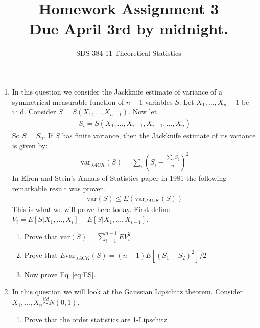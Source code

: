\documentclass[11pt]{article}
\newcommand{\var}{\text{var}}
\begin{document}
\title{{\bf Homework Assignment 3}\\Due April 3rd by midnight.}
\author{SDS 384-11 Theoretical Statistics}

\date{}

\maketitle{}
\begin{enumerate}%
\item 
In this question we consider the Jackknife estimate of variance of a symmetrical measurable function of $n-1$ variables $S$. Let $X_1,\dots,X_n-1$ be i.i.d. Consider $S=S(X_1,\dots,X_{n-1})$. Now let
\begin{align*}
S_i=S(X_1,\dots,X_{i-1},X_{i+1},\dots, X_n)
\end{align*}
So $S=S_n$. If $S$ has finite variance, then the Jackknife estimate of its variance is given by:
\begin{align*}
\var_{JACK}(S)=\sum_i\left(S_i-\frac{\sum_j S_j}{n}\right)^2
\end{align*}
In Efron and Stein's Annals of Statistics paper in 1981 the following remarkable result was proven.
\begin{align}\label{eq:ES}
\var(S)\leq E\left(\var_{JACK}(S)\right)
\end{align}
This is what we will prove here today. First define $V_i=E[S|X_1,\dots,X_i]-E[S|X_1,\dots,X_{i-1}]$. 
\begin{enumerate}
	\item Prove that $\var(S)=\sum_{i=1}^{n-1} E V_i^2$
	\item Prove that $E\var_{JACK}(S)=(n-1)E[(S_1-S_2)^2]/2$
	\item Now prove Eq~\ref{eq:ES}.
\end{enumerate}
\item In this question we will look at the Gaussian Lipschitz theorem. Consider $X_1,\dots, X_n\stackrel{iid}{\sim} N(0,1)$. 
\begin{enumerate}
	\item Prove that the order statistics are 1-Lipschitz.  %

\end{enumerate}
\end{enumerate}
\end{document}
